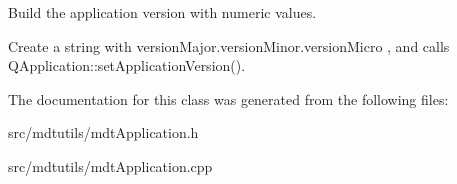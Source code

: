 Build the application version with numeric values. 

Create a string with versionMajor.versionMinor.versionMicro , and calls QApplication::setApplicationVersion(). 

The documentation for this class was generated from the following files:\begin{DoxyCompactItemize}
\item 
src/mdtutils/mdtApplication.h\item 
src/mdtutils/mdtApplication.cpp\end{DoxyCompactItemize}

